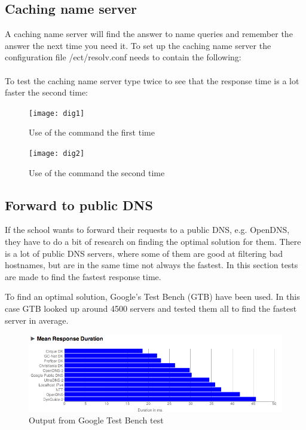 \documentclass[Preamble]{subfiles}
\begin{document}
\subsection{Caching name server}
A caching name server will find the answer to name queries and remember the answer the next time you need it. To set up the caching name server the configuration file /ect/resolv.conf needs to contain the following:\\ \\
To test the caching name server type  twice to see that the response time is a lot faster the second time:

\begin{figure}[H]
\begin{minipage}[b]{0.45\linewidth}
\centering
\texttt{[image: dig1]}
\caption{Use of the command  the first time}
\label{fig:dig1}
\end{minipage}
\hspace{0.5cm}
\begin{minipage}[b]{0.45\linewidth}
\centering
\texttt{[image: dig2]}
\caption{Use of the command  the second time}
\label{fig:dig2}
\end{minipage}
\end{figure}

\subsection{Forward to public DNS}
If the school wants to forward their requests to a public DNS, e.g. OpenDNS, they have to do a bit of research on finding the optimal solution for them. 
There is a lot of public DNS servers, where some of them are good at filtering bad hostnames, but are in the same time not always the fastest.
In this section tests are made to find the fastest response time.

To find an optimal solution, Google's Test Bench (GTB) have been used.
In this case GTB looked up around 4500 servers and tested them all to find the fastest server in average.

\begin{figure}[H]
\centering
\includegraphics[scale=0.5]{Figurer/NamebenchTest.png}
\caption{Output from Google Test Bench test}
\label{fig:testBench}
\end{figure}
\end{document}
